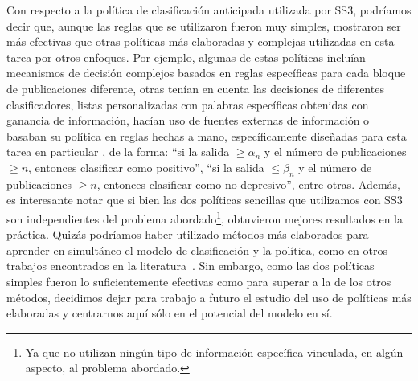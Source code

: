 Con respecto a la política de clasificación anticipada utilizada por SS3, podríamos decir que, aunque las reglas que se utilizaron fueron muy simples, mostraron ser más efectivas que otras políticas más elaboradas y complejas utilizadas en esta tarea por otros enfoques.
Por ejemplo, algunas de estas políticas incluían mecanismos de decisión complejos basados en reglas específicas para cada bloque de publicaciones diferente\cite{errecaldetemporal}, otras tenían en cuenta las decisiones de diferentes clasificadores, listas personalizadas con palabras específicas obtenidas con ganancia de información, hacían uso de fuentes externas de información o basaban su política en reglas hechas a mano, específicamente diseñadas para esta tarea en particular \cite{trotzek2017linguistic}, de la forma: ``si la salida $\geq\alpha_n$ y el número de publicaciones $\geq n$, entonces clasificar como positivo'', ``si la salida $\leq\beta_n$ y el número de publicaciones $\geq n$, entonces clasificar como no depresivo'', entre otras.
Además, es interesante notar que si bien las dos políticas sencillas que utilizamos con SS3 son independientes del problema abordado\footnote{Ya que no utilizan ningún tipo de información específica vinculada, en algún aspecto, al problema abordado.}, obtuvieron mejores resultados en la práctica.
Quizás podríamos haber utilizado métodos más elaborados para aprender en simultáneo el modelo de clasificación y la política, como en otros trabajos encontrados en la literatura~\cite{dulac2011text, yu2017learning}.
Sin embargo, como las dos políticas simples fueron lo suficientemente efectivas como para superar a la de los otros métodos, decidimos dejar para trabajo a futuro el estudio del uso de políticas más elaboradas y centrarnos aquí sólo en el potencial del modelo en sí.

